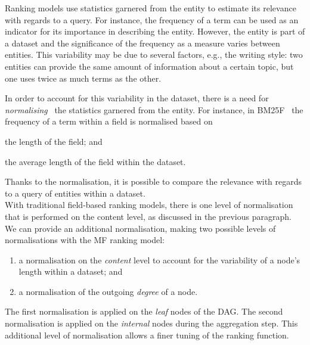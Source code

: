 Ranking models use statistics garnered from the entity to estimate its relevance with regards to a query. For instance, the frequency of a term can be used as an indicator for its importance in describing the entity. However, the entity is part of a dataset and the significance of the frequency as a measure varies between entities. This variability may be due to several factors, e.g., the writing style: two entities can provide the same amount of information about a certain topic, but one uses twice as much terms as the other.

In order to account for this variability in the dataset, there is a need for \emph{normalising}~\cite{manning:2008:iir} the statistics garnered from the entity. For instance, in BM25F~\cite{zaragoza:2004:microsoft} the frequency of a term within a field is normalised based on
\begin{inparaenum}[(a)]
	\item the length of the field; and
	\item the average length of the field within the dataset.
\end{inparaenum}
Thanks to the normalisation, it is possible to compare the relevance with regards to a query of entities within a dataset.\\

With traditional field-based ranking models, there is one level of normalisation that is performed on the content level, as discussed in the previous paragraph.
We can provide an additional normalisation, making two possible levels of normalisations with the MF ranking model:
\begin{enumerate}
	\item a normalisation on the \emph{content} level to account for the variability of a node's length within a dataset; and
	\label{norm:content}
	\item a normalisation of the outgoing \emph{degree} of a node.
	\label{norm:degree}
\end{enumerate}
The first normalisation is applied on the \emph{leaf} nodes of the DAG. The second normalisation is applied on the \emph{internal} nodes during the aggregation step. This additional level of normalisation allows a finer tuning of the ranking function.

